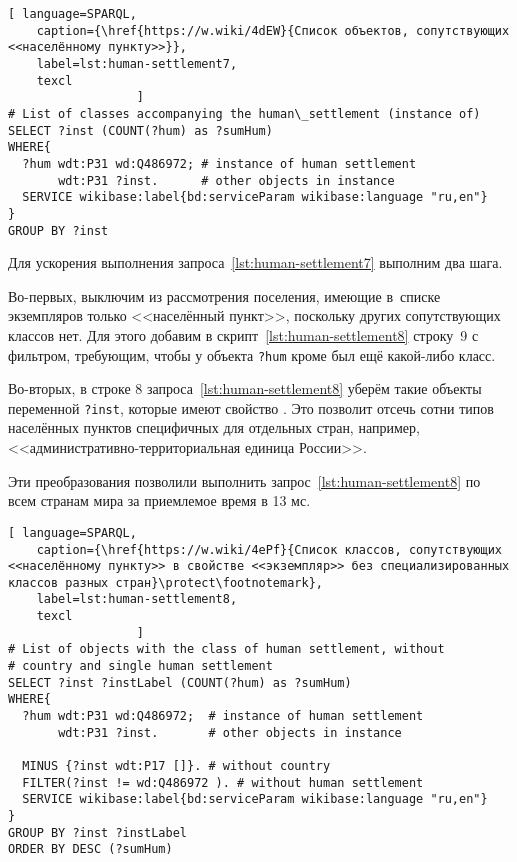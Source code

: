 \begin{lstlisting}[ language=SPARQL, 
    caption={\href{https://w.wiki/4dEW}{Cписок объектов, сопутствующих <<населённому пункту>>}},
    label=lst:human-settlement7,
    texcl 
                  ]
# List of classes accompanying the human\_settlement (instance of)
SELECT ?inst (COUNT(?hum) as ?sumHum) 
WHERE{          
  ?hum wdt:P31 wd:Q486972; # instance of human settlement
       wdt:P31 ?inst.      # other objects in instance
  SERVICE wikibase:label{bd:serviceParam wikibase:language "ru,en"}
}  
GROUP BY ?inst
\end{lstlisting}%

Для ускорения выполнения запроса~\ref{lst:human-settlement7} выполним два шага.
 
Во-первых, выключим из рассмотрения поселения, 
имеющие в~списке экземпляров только <<населённый пункт>>, 
поскольку других сопутствующих классов нет. 
Для этого добавим в скрипт~\ref{lst:human-settlement8} строку~\num{9} с фильтром, 
требующим, чтобы у объекта \lstinline|?hum| 
кроме   был ещё какой-либо класс.

Во-вторых, в строке \num{8} запроса~\ref{lst:human-settlement8} 
уберём такие объекты переменной \lstinline|?inst|, 
которые имеют свойство . 
Это позволит отсечь сотни типов населённых пунктов специфичных для отдельных стран, 
например, <<административно-территориальная единица России>>.

Эти преобразования позволили выполнить запрос~\ref{lst:human-settlement8} 
по всем странам мира за приемлемое время в 13 мс.

\lstset{numbers=left, firstnumber=1, frame=single}
\begin{lstlisting}[ language=SPARQL, 
    caption={\href{https://w.wiki/4ePf}{Cписок классов, сопутствующих <<населённому пункту>> в свойстве <<экземпляр>> без специализированных классов разных стран}\protect\footnotemark},
    label=lst:human-settlement8,
    texcl 
                  ]
# List of objects with the class of human settlement, without 
# country and single human settlement
SELECT ?inst ?instLabel (COUNT(?hum) as ?sumHum) 
WHERE{ 
  ?hum wdt:P31 wd:Q486972;  # instance of human settlement
       wdt:P31 ?inst.       # other objects in instance
  
  MINUS {?inst wdt:P17 []}. # without country
  FILTER(?inst != wd:Q486972 ). # without human settlement
  SERVICE wikibase:label{bd:serviceParam wikibase:language "ru,en"}
}  
GROUP BY ?inst ?instLabel
ORDER BY DESC (?sumHum)
\end{lstlisting}%

